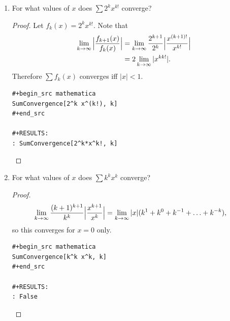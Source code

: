 \documentclass[12pt]{article}
\begin{document}
\begin{enumerate}[label=(\alph*)]
\begin{proof}

 \end{proof}

\newpage
\item
  \begin{problem*}
    For what values of $x$ does $\sum 2^kx^{k!}$ converge?
  \end{problem*}
  \begin{proof}
    Let $f_k(x) = 2^kx^{k!}$. Note that
    \begin{align*}
      \limk \Big|\frac{f_{k+1}(x)}{f_k(x)}\Big|
      &= \limk \frac{2^{k+1}}{2^k} \Big|\frac{x^{(k+1)!}}{x^{k!}}\Big|\\
      &= 2 \limk |x^{kk!}|.
    \end{align*}
    Therefore $\sum f_k(x)$ converges iff $|x| < 1$.

\begin{verbatim}
#+begin_src mathematica
SumConvergence[2^k x^(k!), k]
#+end_src

#+RESULTS:
: SumConvergence[2^k*x^k!, k]

\end{verbatim}

  \end{proof}

\newpage
\item
  \begin{problem*}
    For what values of $x$ does $\sum k^kx^k$ converge?
  \end{problem*}
  \begin{proof}
    \begin{align*}
      \limk \frac{(k+1)^{k+1}}{k^k} \Big|\frac{x^{k+1}}{x^k}\Big|
      &= \limk |x| (k^1 + k^0 + k^{-1} + \ldots + k^{-k}),
    \end{align*}
    so this converges for $x=0$ only.

\begin{verbatim}
#+begin_src mathematica
SumConvergence[k^k x^k, k]
#+end_src

#+RESULTS:
: False

\end{verbatim}



  \end{proof}


\end{enumerate}
\end{document}
